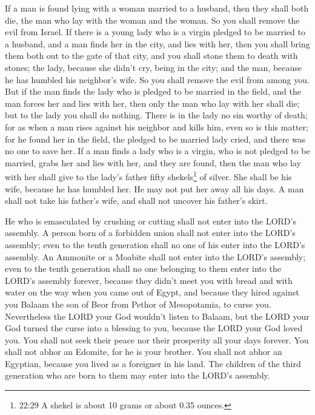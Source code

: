 \myverse{}If a man is found lying with a woman married to a husband, then
they shall both die, the man who lay with the woman and the woman. So you shall remove the evil from Israel.
\myverse{}If there is a young lady who is a virgin pledged to be married to a husband,
and a man finds her in the city, and lies with her,
\myverse{}then you shall bring them both out to the gate of that city, and you shall
stone them to death with stones; the lady, because she didn’t cry, being in the city; and the man, because
he has humbled his neighbor’s wife. So you shall remove the evil from among you.
\myverse{}But if the man finds the lady who is pledged to be married in the field,
and the man forces her and lies with her, then only the man who lay with her shall die;
\myverse{}but to the lady you shall do nothing. There is in the lady no sin worthy
of death; for as when a man rises against his neighbor and kills him, even so is this matter;
\myverse{}for he found her in the field, the pledged to be married lady cried, and
there was no one to save her.
\myverse{}If a man finds a lady who is a virgin, who is not pledged to be married,
grabs her and lies with her, and they are found,
\myverse{}then the man who lay with her shall give to the lady’s father fifty shekels\footnote{22:29 A shekel is about 10 grams or about 0.35 ounces.} of silver. She shall be his wife, because
he has humbled her. He may not put her away all his days.
\myverse{}A man shall not take his father’s wife, and shall not uncover his father’s
skirt.


\mychapter{} \myverse*{}He who is emasculated by crushing or cutting shall not enter into
the LORD’s assembly.
\myverse{}A person born of a forbidden union shall not enter into the LORD’s assembly;
even to the tenth generation shall no one of his enter into the LORD’s assembly.
\myverse{}An Ammonite or a Moabite shall not enter into the LORD’s assembly; even to
the tenth generation shall no one belonging to them enter into the LORD’s assembly forever,
\myverse{}because they didn’t meet you with bread and with water on the way when you
came out of Egypt, and because they hired against you Balaam the son of Beor from Pethor of Mesopotamia,
to curse you.
\myverse{}Nevertheless the LORD your God wouldn’t listen to Balaam, but the LORD your
God turned the curse into a blessing to you, because the LORD your God loved you.
\myverse{}You shall not seek their peace nor their prosperity all your days forever.
\myverse{}You shall not abhor an Edomite, for he is your brother. You shall not abhor
an Egyptian, because you lived as a foreigner in his land.
\myverse{}The children of the third generation who are born to them may enter into the
LORD’s assembly.


